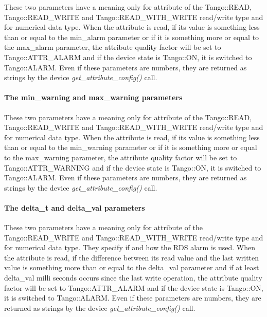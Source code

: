 These two parameters have a meaning only for attribute of the Tango::READ,
Tango::READ\_WRITE and Tango::READ\_WITH\_WRITE read/write type and
for numerical data type. When the attribute is read, if its value
is something less than or equal to the min\_alarm parameter or if
it is something more or equal to the max\_alarm parameter, the attribute
quality factor will be set to Tango::ATTR\_ALARM
and if the device state is Tango::ON, it is switched to Tango::ALARM.
Even if these parameters are numbers, they are returned as strings
by the device \emph{get\_attribute\_config()} call.

\paragraph{The min\_warning and max\_warning
parameters}

These two parameters have a meaning only for attribute of the Tango::READ,
Tango::READ\_WRITE and Tango::READ\_WITH\_WRITE read/write type and
for numerical data type. When the attribute is read, if its value
is something less than or equal to the min\_warning parameter or if
it is something more or equal to the max\_warning parameter, the attribute
quality factor will be set to Tango::ATTR\_WARNING
and if the device state is Tango::ON, it is switched to Tango::ALARM.
Even if these parameters are numbers, they are returned as strings
by the device \emph{get\_attribute\_config()} call.

\paragraph{The delta\_t and delta\_val parameters}

These two parameters have a meaning only for attribute of the Tango::READ\_WRITE
and Tango::READ\_WITH\_WRITE read/write type and for numerical data
type. They specify if and how the RDS alarm is used. When
the attribute is read, if the difference between its read value and
the last written value is something more than or equal to the delta\_val
parameter and if at least delta\_val milli seconds occurs since the
last write operation, the attribute quality factor will be set to
Tango::ATTR\_ALARM and if the device state is Tango::ON,
it is switched to Tango::ALARM. Even if these parameters
are numbers, they are returned as strings by the device \emph{get\_attribute\_config()}
call.

